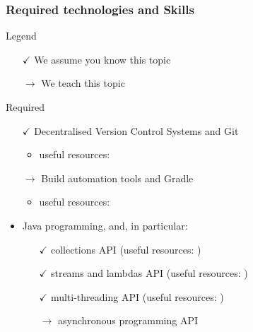 \documentclass[handout]{beamer}\mode<presentation>{\usetheme{AMSCesenaPurpleAndGold}}
\begin{document}
\begin{frame}[allowframebreaks]
	\frametitle{Required technologies and Skills}
	
	\begin{block}{Legend}
		\begin{multicols}{2}
			\begin{itemize}
				\item[$\checkmark$] We assume you know this topic
				\item[$\rightarrow$] We teach this topic
			\end{itemize}
		\end{multicols}
	\end{block}
	
	\begin{alertblock}{Required}
		\begin{itemize}
			\item[$\checkmark$] Decentralised Version Control Systems and \alert{Git}
			\begin{itemize}
				\item useful resources: 
			\end{itemize}
		
			\vfill
		
			\item[$\rightarrow$] Build automation tools and \alert{Gradle}
			\begin{itemize}
				\item useful resources: 
			\end{itemize}
		
			\vfill
			
			\item Java programming, and, in particular:
			\begin{itemize}
				\item[$\checkmark$] collections API (useful resources: )
				\item[$\checkmark$] streams and lambdas API (useful resources: )
				\item[$\checkmark$] multi-threading API (useful resources: )
				\item[$\rightarrow$] asynchronous programming API
			\end{itemize}
			
		\end{itemize}
	\end{alertblock}


\end{frame}
\end{document}

